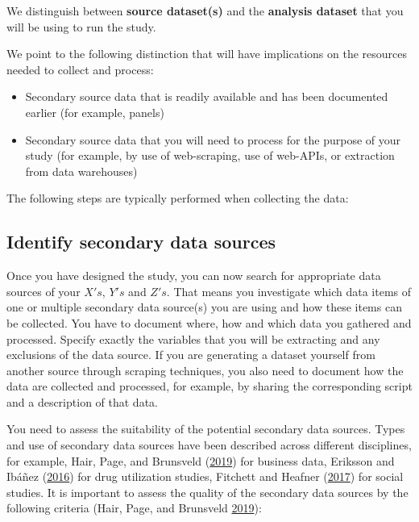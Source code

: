 \documentclass[
]{book}
\providecommand{\tightlist}{%
  \setlength{\itemsep}{0pt}\setlength{\parskip}{0pt}}
\begin{document}
We distinguish between \textbf{source dataset(s)} and the
\textbf{analysis dataset} that you will be using to run the study.

We point to the following distinction that will have implications on the
resources needed to collect and process:

\begin{itemize}
\tightlist
\item
  Secondary source data that is readily available and has been
  documented earlier (for example, panels)
\item
  Secondary source data that you will need to process for the purpose of
  your study (for example, by use of web-scraping, use of web-APIs, or
  extraction from data warehouses)
\end{itemize}

The following steps are typically performed when collecting the data:

\hypertarget{identify-secondary-data-sources}{%
\subsection{Identify secondary data
sources}\label{identify-secondary-data-sources}}

Once you have designed the study, you can now search for appropriate
data sources of your \(X's\), \(Y's\) and \(Z's\). That means you
investigate which data items of one or multiple secondary data source(s)
you are using and how these items can be collected. You have to document
where, how and which data you gathered and processed. Specify exactly
the variables that you will be extracting and any exclusions of the data
source. If you are generating a dataset yourself from another source
through scraping techniques, you also need to document how the data are
collected and processed, for example, by sharing the corresponding
script and a description of that data.

You need to assess the suitability of the potential secondary data
sources. Types and use of secondary data sources have been described
across different disciplines, for example, Hair, Page, and Brunsveld
(\protect\hyperlink{ref-hair_nature_2019}{2019}) for business data,
Eriksson and Ibáñez
(\protect\hyperlink{ref-eriksson_secondary_2016}{2016}) for drug
utilization studies, Fitchett and Heafner
(\protect\hyperlink{ref-fitchett_quantitative_2017}{2017}) for social
studies. It is important to assess the quality of the secondary data
sources by the following criteria (Hair, Page, and Brunsveld
\protect\hyperlink{ref-hair_nature_2019}{2019}):
\end{document}
